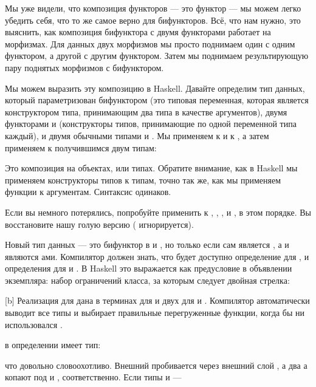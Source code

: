 Мы уже видели, что композиция функторов --- это функтор --- мы
можем легко убедить себя, что то же самое верно для бифункторов. Всё,
что нам нужно, это выяснить, как композиция бифунктора с двумя
функторами работает на морфизмах. Для данных двух морфизмов мы просто поднимаем один
с одним функтором, а другой с другим функтором. Затем мы поднимаем
результирующую пару поднятых морфизмов с бифунктором.

Мы можем выразить эту композицию в Haskell. Давайте определим тип данных,
который параметризован бифунктором  (это типовая переменная,
которая является конструктором типа, принимающим два типа в качестве аргументов), двумя
функторами  и  (конструкторы типов, принимающие по одной
переменной типа каждый), и двумя обычными типами  и .
Мы применяем  к  и  к , а затем
применяем  к получившимся двум типам:

Это композиция на объектах, или типах. Обратите внимание, как в Haskell мы
применяем конструкторы типов к типам, точно так же, как мы применяем функции к
аргументам. Синтаксис одинаков.

Если вы немного потерялись, попробуйте применить  к
, , ,  и
, в этом порядке. Вы восстановите нашу голую версию
 ( игнорируется).

Новый тип данных  --- это бифунктор в  и
, но только если  сам является , а
 и  являются ами. Компилятор должен
знать, что будет доступно определение  для
, и определения  для  и
. В Haskell это выражается как предусловие в
объявлении экземпляра: набор ограничений класса, за которым следует двойная
стрелка:

[b]
Реализация  для  дана в
терминах  для  и двух  для
 и . Компилятор автоматически выводит все
типы и выбирает правильные перегруженные функции, когда бы ни
использовался .

 в определении  имеет тип:

что довольно словоохотливо. Внешний  пробивается через
внешний слой , а два а копают под
 и , соответственно. Если типы 
и  ---

